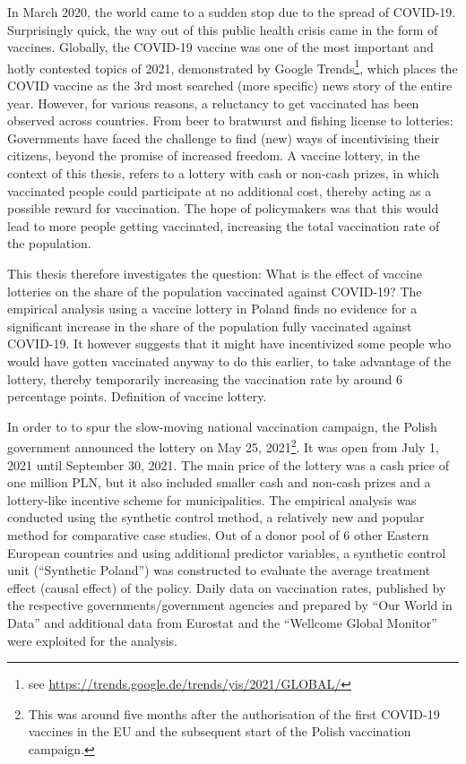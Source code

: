 \documentclass{scrbook}
\begin{document}
In March 2020, the world came to a sudden stop due to the spread of
COVID-19. Surprisingly quick, the way out of this public health crisis
came in the form of vaccines. Globally, the COVID-19 vaccine was one of
the most important and hotly contested topics of 2021, demonstrated by
Google
Trends\footnote{see \url{https://trends.google.de/trends/yis/2021/GLOBAL/}},
which places the COVID vaccine as the 3rd most searched (more specific)
news story of the entire year. However, for various reasons, a
reluctancy to get vaccinated has been observed across countries. From
beer to bratwurst and fishing license to lotteries: Governments have
faced the challenge to find (new) ways of incentivising their citizens,
beyond the promise of increased freedom. A vaccine lottery, in the
context of this thesis, refers to a lottery with cash or non-cash
prizes, in which vaccinated people could participate at no additional
cost, thereby acting as a possible reward for vaccination. The hope of
policymakers was that this would lead to more people getting vaccinated,
increasing the total vaccination rate of the population.

This thesis therefore investigates the question: What is the effect of
vaccine lotteries on the share of the population vaccinated against
COVID-19? The empirical analysis using a vaccine lottery in Poland finds
no evidence for a significant increase in the share of the population
fully vaccinated against COVID-19. It however suggests that it might
have incentivized some people who would have gotten vaccinated anyway to
do this earlier, to take advantage of the lottery, thereby temporarily
increasing the vaccination rate by around 6 percentage points.
Definition of vaccine lottery.

In order to to spur the slow-moving national vaccination campaign, the
Polish government announced the lottery on May 25,
2021\footnote{This was around five months after the authorisation of the first COVID-19 vaccines in the EU and the subsequent start of the Polish vaccination campaign.}.
It was open from July 1, 2021 until September 30, 2021. The main price
of the lottery was a cash price of one million PLN, but it also included
smaller cash and non-cash prizes and a lottery-like incentive scheme for
municipalities. The empirical analysis was conducted using the synthetic
control method, a relatively new and popular method for comparative case
studies. Out of a donor pool of 6 other Eastern European countries and
using additional predictor variables, a synthetic control unit
(``Synthetic Poland'') was constructed to evaluate the average treatment
effect (causal effect) of the policy. Daily data on vaccination rates,
published by the respective governments/government agencies and prepared
by ``Our World in Data'' and additional data from Eurostat and the
``Wellcome Global Monitor'' were exploited for the analysis.
\end{document}
